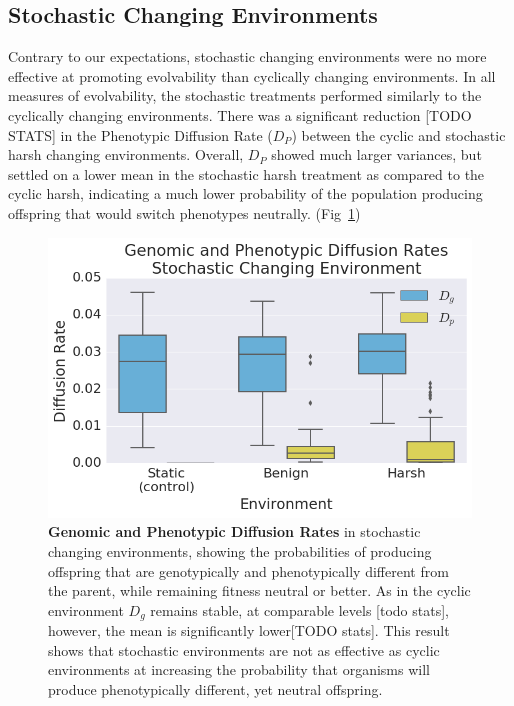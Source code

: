 \documentclass[PhD]{msu-thesis}
\begin{document}
\subsection{Stochastic Changing Environments}
Contrary to our expectations, stochastic changing environments were no more effective at
promoting evolvability than cyclically changing environments. In all measures of evolvability, the stochastic treatments performed similarly to the cyclically changing environments. There was a significant reduction [TODO STATS] in the Phenotypic Diffusion Rate ($D_P$) between the cyclic and stochastic harsh changing environments. Overall, $D_P$ showed much larger variances, but settled on a lower mean in the stochastic harsh treatment as compared to the cyclic harsh, indicating a much lower probability of the population producing offspring that would switch phenotypes neutrally. (Fig~\ref{fig:CSE_diffusion_rate})

	\begin{figure}[!h] %
	\includegraphics[trim={0.2cm 0 0.4cm 0.25cm},clip,width=0.75\columnwidth]{figures/CE/CSE_D_g_D_p__box.png}
	\caption{\textbf{Genomic and Phenotypic Diffusion Rates} in stochastic changing environments, showing the probabilities of producing offspring that are genotypically and phenotypically different from the parent, while remaining fitness neutral or better. As in the cyclic environment $D_g$ remains stable, at comparable levels [todo stats], however, the mean is significantly lower[TODO stats]. This result shows that stochastic environments are not as effective as cyclic environments at increasing the probability that organisms will produce phenotypically different, yet neutral offspring.
	}\label{fig:CSE_diffusion_rate}
	\end{figure}
\end{document}
